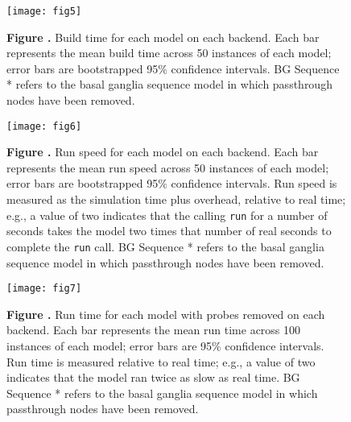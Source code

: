 \documentclass{frontiersSCNS}
\begin{document}
\begin{figure}[!ht]
\begin{center}
  \texttt{[image: fig5]}
\end{center}
\textbf{\label{fig:05} Figure .}
       {Build time for each model on each backend. Each bar represents
         the mean build time across 50 instances of each model;
         error bars are bootstrapped 95\% confidence intervals.
         BG Sequence * refers to the basal ganglia sequence model
         in which passthrough nodes have been removed.}
\end{figure}

\begin{figure}[!ht]
\begin{center}
  \texttt{[image: fig6]}
\end{center}
\textbf{\label{fig:06} Figure .}
       {Run speed for each model on each backend. Each bar represents
         the mean run speed across 50 instances of each model;
         error bars are bootstrapped 95\% confidence intervals.
         Run speed is measured as the simulation time plus overhead,
         relative to real time; e.g., a value of two indicates that
         the calling \texttt{run} for a number of seconds takes
         the model two times that number of real seconds to complete the
         \texttt{run} call.
         BG Sequence * refers to the basal ganglia sequence model
         in which passthrough nodes have been removed.}

\end{figure}

\begin{figure}[!ht]
\begin{center}
  \texttt{[image: fig7]}
\end{center}
\textbf{\label{fig:07} Figure .}
       {Run time for each model with probes removed on each backend.
         Each bar represents the mean run time across 100 instances
         of each model;
         error bars are 95\% confidence intervals.
         Run time is measured relative to real time;
         e.g., a value of two indicates that the model ran twice as slow
         as real time.
         BG Sequence * refers to the basal ganglia sequence model
         in which passthrough nodes have been removed.}
\end{figure}
\end{document}
